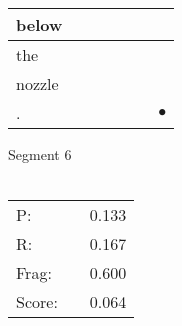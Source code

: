 \documentclass[landscape]{article}
\newcommand{\ssp}{\hspace{2pt}}
\newcommand{\mex}{\cellcolor{g}$\bullet$}
\begin{document}
\begin{tabular}{|l|p{10pt}|p{10pt}|p{10pt}|p{10pt}|p{10pt}|p{10pt}|}
\hline
\ssp below \ssp&\hspace{2pt}&\hspace{2pt}&\hspace{2pt}&\hspace{2pt}&\hspace{2pt}&\hspace{2pt}\\
\hline
\ssp the \ssp&\hspace{2pt}&\hspace{2pt}&\hspace{2pt}&\hspace{2pt}&\hspace{2pt}&\hspace{2pt}\\
\hline
\ssp nozzle \ssp&\hspace{2pt}&\hspace{2pt}&\hspace{2pt}&\hspace{2pt}&\hspace{2pt}&\hspace{2pt}\\
\hline
\ssp \cellcolor{ref5}. \ssp&\hspace{2pt}&\hspace{2pt}&\hspace{2pt}&\hspace{2pt}&\hspace{2pt}&\hspace{2pt}\mex\\
\hline
\end{tabular}

\vspace{6pt}
\noindent Segment 6\\\\
\noindent\begin{tabular}{lm{12pt}r}
\hline
P:&&0.133\\
R:&&0.167\\
Frag:&&0.600\\
Score:&&0.064\\
\end{tabular}

\newpage
\end{document}
